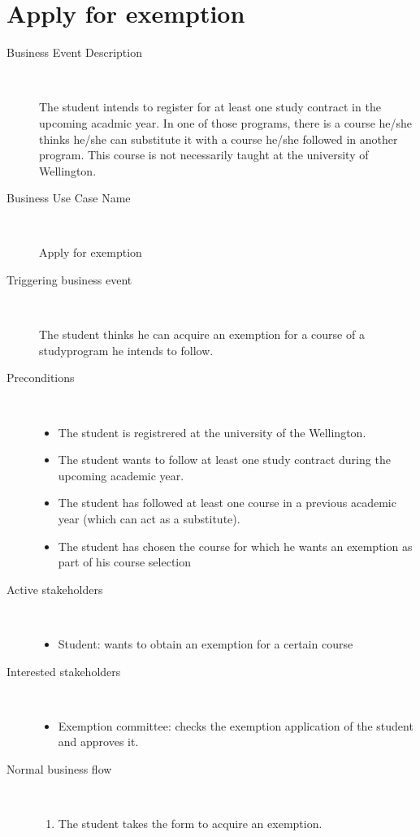 \section{Apply for exemption}

\begin{description}
	\item[Business Event Description] \ 
		\par The student intends to register for at least one study contract in the
		upcoming acadmic year. In one of those programs, there is a course he/she
		thinks he/she can substitute it with a course he/she followed in another
		program. This course is not necessarily taught at the university of
		Wellington.
	\item[Business Use Case Name] \ 
		\par Apply for exemption
	\item[Triggering business event] \ 
		\par The student thinks he can acquire an exemption for a course of a
		studyprogram he intends to follow.
	\item[Preconditions] \
	\begin{itemize}
		\item The student is registrered at the university of the Wellington.
		\item The student wants to follow at least one study contract during the
		upcoming academic year. 
		\item The student has followed at least one course in a previous academic year
		(which can act as a substitute).
		\item The student has chosen the course for which he wants an exemption as part 
		of his course selection
	\end{itemize}
	\item[Active stakeholders] \ 
	\begin{itemize}
		\item Student: wants to obtain an exemption for a certain course
	\end{itemize}
	\item[Interested stakeholders] \ 
		\begin{itemize}
		\item Exemption committee: checks the exemption application of the student
		and approves it.
		\end{itemize}
	\item[Normal business flow] \ 
	\begin{enumerate}
	  	\item The student takes the form to acquire an exemption.

\end{enumerate}
\end{description}
